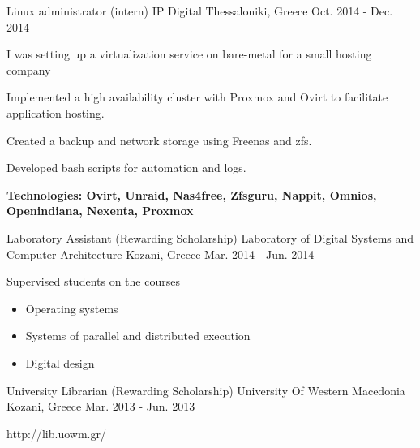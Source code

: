 \begin{cventries}

\cventry
{Linux administrator (intern)} %
{IP Digital} %
{Thessaloniki, Greece} %
{Oct. 2014 - Dec. 2014} %
{ %
\begin{cvitems}
\item {I was setting up a virtualization service on bare-metal for a small hosting company}
\item {Implemented a high availability cluster with Proxmox and Ovirt to facilitate application hosting.}
\item {Created a backup and network storage using Freenas and zfs.}
\item {Developed bash scripts for automation and logs.}
\item {\bfseries{Technologies:} Ovirt, Unraid, Nas4free, Zfsguru, Nappit, Omnios, Openindiana, Nexenta, Proxmox}
\end{cvitems}
}


\cventry
{Laboratory Assistant (Rewarding Scholarship)} %
{Laboratory of Digital Systems and Computer Architecture} %
{Kozani, Greece} %
{Mar. 2014 - Jun. 2014} %
{ %
\begin{cvitems}
\item {Supervised students on the courses}
\begin{itemize}
\item {Operating systems}
\item {Systems of parallel and distributed execution}
\item {Digital design}
\end{itemize}
\end{cvitems}
}


\cventry
{University Librarian (Rewarding Scholarship)} %
{University Of Western Macedonia} %
{Kozani, Greece} %
{Mar. 2013 - Jun. 2013} %
{ %
\begin{cvitems}
\item {http://lib.uowm.gr/}
\end{cvitems}
}


\end{cventries}
